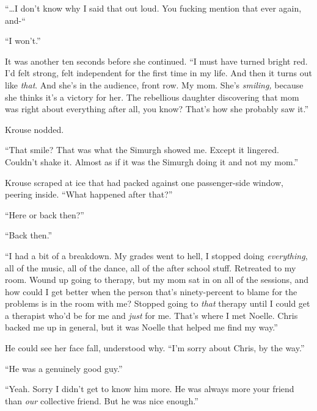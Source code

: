 ``\ldots{}I don't know why I said that out loud.  You fucking mention that ever again, and-``



``I won't.''



It was another ten seconds before she continued.  ``I must have turned bright red.  I'd felt strong, felt independent for the first time in my life.  And then it turns out like \emph{that}.  And she's in the audience, front row.  My mom.  She's \emph{smiling, }because she thinks it's a victory for her.  The rebellious daughter discovering that mom was right about everything after all, you know?  That's how she probably saw it.''



Krouse nodded.



``That smile?  That was what the Simurgh showed me.  Except it lingered.  Couldn't shake it.  Almost as if it was the Simurgh doing it and not my mom.''



Krouse scraped at ice that had packed against one passenger-side window, peering inside.  ``What happened after that?''



``Here or back then?''



``Back then.''



``I had a bit of a breakdown.  My grades went to hell, I stopped doing \emph{everything}, all of the music, all of the dance, all of the after school stuff.  Retreated to my room.  Wound up going to therapy, but my mom sat in on all of the sessions, and how could I get better when the person that's ninety-percent to blame for the problems is in the room with me?  Stopped going to \emph{that} therapy until I could get a therapist who'd be for me and \emph{just} for me.  That's where I met Noelle.  Chris backed me up in general, but it was Noelle that helped me find my way.''



He could see her face fall, understood why.  ``I'm sorry about Chris, by the way.''



``He was a genuinely good guy.''



``Yeah.  Sorry I didn't get to know him more.  He was always more your friend than \emph{our} collective friend.  But he was nice enough.''



